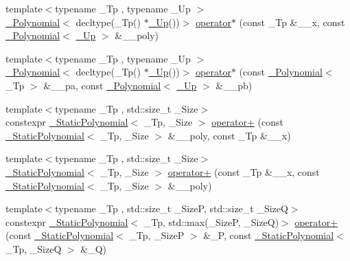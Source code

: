 \begin{DoxyCompactItemize}
\item 
{\footnotesize template$<$typename \+\_\+\+Tp , typename \+\_\+\+Up $>$ }\\\hyperlink{class____gnu__cxx_1_1__Polynomial}{\+\_\+\+Polynomial}$<$ decltype(\+\_\+\+Tp() $\ast$\hyperlink{namespace____gnu__cxx_ab693ea357b6429b331e0bf09f9442385}{\+\_\+\+Up}())$>$ \hyperlink{namespace____gnu__cxx_ac79cfe2d37e5d8116fcf51911c21c253}{operator$\ast$} (const \+\_\+\+Tp \&\+\_\+\+\_\+x, const \hyperlink{class____gnu__cxx_1_1__Polynomial}{\+\_\+\+Polynomial}$<$ \hyperlink{namespace____gnu__cxx_ab693ea357b6429b331e0bf09f9442385}{\+\_\+\+Up} $>$ \&\+\_\+\+\_\+poly)
\item 
{\footnotesize template$<$typename \+\_\+\+Tp , typename \+\_\+\+Up $>$ }\\\hyperlink{class____gnu__cxx_1_1__Polynomial}{\+\_\+\+Polynomial}$<$ decltype(\+\_\+\+Tp() $\ast$\hyperlink{namespace____gnu__cxx_ab693ea357b6429b331e0bf09f9442385}{\+\_\+\+Up}())$>$ \hyperlink{namespace____gnu__cxx_a2f76fd6f7c2c9e64fba1d5892844f26b}{operator$\ast$} (const \hyperlink{class____gnu__cxx_1_1__Polynomial}{\+\_\+\+Polynomial}$<$ \+\_\+\+Tp $>$ \&\+\_\+\+\_\+pa, const \hyperlink{class____gnu__cxx_1_1__Polynomial}{\+\_\+\+Polynomial}$<$ \hyperlink{namespace____gnu__cxx_ab693ea357b6429b331e0bf09f9442385}{\+\_\+\+Up} $>$ \&\+\_\+\+\_\+pb)
\item 
{\footnotesize template$<$typename \+\_\+\+Tp , std\+::size\+\_\+t \+\_\+\+Size$>$ }\\constexpr \hyperlink{class____gnu__cxx_1_1__StaticPolynomial}{\+\_\+\+Static\+Polynomial}$<$ \+\_\+\+Tp, \+\_\+\+Size $>$ \hyperlink{namespace____gnu__cxx_a6864af2e99c7797a84209d8dffcf11e5}{operator+} (const \hyperlink{class____gnu__cxx_1_1__StaticPolynomial}{\+\_\+\+Static\+Polynomial}$<$ \+\_\+\+Tp, \+\_\+\+Size $>$ \&\+\_\+\+\_\+poly, const \+\_\+\+Tp \&\+\_\+\+\_\+x)
\item 
{\footnotesize template$<$typename \+\_\+\+Tp , std\+::size\+\_\+t \+\_\+\+Size$>$ }\\\hyperlink{class____gnu__cxx_1_1__StaticPolynomial}{\+\_\+\+Static\+Polynomial}$<$ \+\_\+\+Tp, \+\_\+\+Size $>$ \hyperlink{namespace____gnu__cxx_a06334b50d2c25cdadf11c1785a57cde0}{operator+} (const \+\_\+\+Tp \&\+\_\+\+\_\+x, const \hyperlink{class____gnu__cxx_1_1__StaticPolynomial}{\+\_\+\+Static\+Polynomial}$<$ \+\_\+\+Tp, \+\_\+\+Size $>$ \&\+\_\+\+\_\+poly)
\item 
{\footnotesize template$<$typename \+\_\+\+Tp , std\+::size\+\_\+t \+\_\+\+SizeP, std\+::size\+\_\+t \+\_\+\+SizeQ$>$ }\\constexpr \hyperlink{class____gnu__cxx_1_1__StaticPolynomial}{\+\_\+\+Static\+Polynomial}$<$ \+\_\+\+Tp, std\+::max(\+\_\+\+SizeP, \+\_\+\+SizeQ)$>$ \hyperlink{namespace____gnu__cxx_ab21b8f613598d3de78239f9a5d45bee7}{operator+} (const \hyperlink{class____gnu__cxx_1_1__StaticPolynomial}{\+\_\+\+Static\+Polynomial}$<$ \+\_\+\+Tp, \+\_\+\+SizeP $>$ \&\+\_\+P, const \hyperlink{class____gnu__cxx_1_1__StaticPolynomial}{\+\_\+\+Static\+Polynomial}$<$ \+\_\+\+Tp, \+\_\+\+SizeQ $>$ \&\+\_\+Q)

\end{DoxyCompactItemize}
